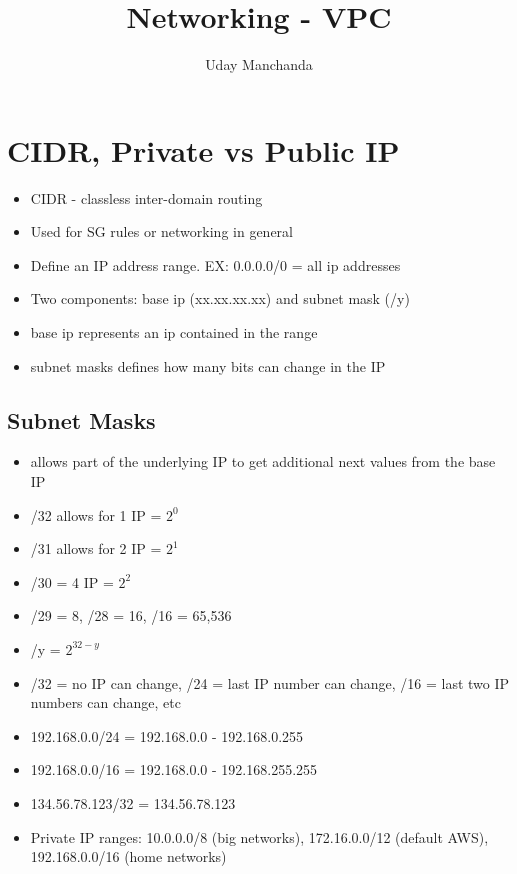 \documentclass[]{scrartcl}
\title{Networking - VPC}
\author{Uday Manchanda}
\begin{document}
\maketitle

\section{CIDR, Private vs Public IP}
\begin{itemize}
	\item CIDR - classless inter-domain routing
	\item Used for SG rules or networking in general
	\item Define an IP address range. EX: 0.0.0.0/0 = all ip addresses
	\item Two components: base ip (xx.xx.xx.xx) and subnet mask (/y)
	\item base ip represents an ip contained in the range
	\item subnet masks defines how many bits can change in the IP
\end{itemize}

\subsection{Subnet Masks}
\begin{itemize}
	\item allows part of the underlying IP to get additional next values from the base IP
	\item /32 allows for 1 IP = $2^0$
	\item /31 allows for 2 IP = $2^1$
	\item /30 = 4 IP = $2^2$
	\item /29 = 8, /28 = 16, /16 = 65,536
	\item /y = $2^{32-y}$
	\item /32 = no IP can change, /24 = last IP number can change, /16 = last two IP numbers can change, etc
	\item 192.168.0.0/24 = 192.168.0.0 - 192.168.0.255
	\item 192.168.0.0/16 = 192.168.0.0 - 192.168.255.255
	\item 134.56.78.123/32 = 134.56.78.123
	\item Private IP ranges: 10.0.0.0/8 (big networks), 172.16.0.0/12 (default AWS), 192.168.0.0/16 (home networks) 
\end{itemize}
\end{document}

